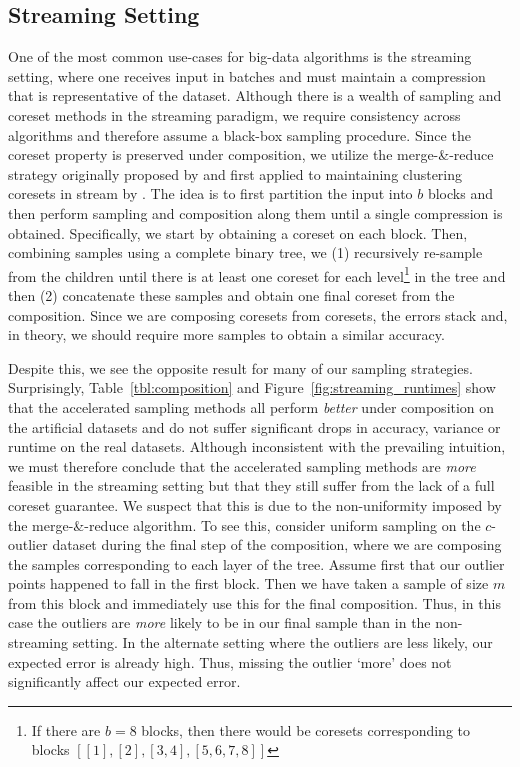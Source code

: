\subsection{Streaming Setting}
\label{ssec:streaming}



One of the most common use-cases for big-data algorithms is the streaming setting, where one receives input in batches and must maintain a compression that is
representative of the dataset. Although there is a wealth of sampling and coreset methods in the streaming paradigm, we require consistency across algorithms
and therefore assume a black-box sampling procedure. Since the coreset property is preserved under composition, we utilize the merge-\&-reduce strategy
originally proposed by \cite{BS80} and first applied to maintaining clustering coresets in stream by \cite{HaM04}. The idea is to first partition the input into
$b$ blocks and then perform sampling and composition along them until a single compression is obtained. Specifically, we start by obtaining a coreset on each
block. Then, combining samples using a complete binary tree, we (1) recursively re-sample from the children until there is at least one coreset for each
level\footnote{If there are $b=8$ blocks, then there would be coresets corresponding to blocks $[[1], [2], [3, 4], [5, 6, 7, 8]]$} in the tree and then (2)
concatenate these samples and obtain one final coreset from the composition. Since we are composing coresets from coresets, the errors stack and, in theory, we
should require more samples to obtain a similar accuracy.

Despite this, we see the opposite result for many of our sampling strategies. Surprisingly, Table~\ref{tbl:composition} and Figure~\ref{fig:streaming_runtimes}
show that the accelerated sampling methods all perform \emph{better} under composition on the artificial datasets and do not suffer significant drops in
accuracy, variance or runtime on the real datasets. Although inconsistent with the prevailing intuition, we must therefore conclude that the accelerated
sampling methods are \emph{more} feasible in the streaming setting but that they still suffer from the lack of a full coreset guarantee.  We suspect that this
is due to the non-uniformity imposed by the merge-\&-reduce algorithm. To see this, consider uniform sampling on the $c$-outlier dataset during the final step
of the composition, where we are composing the samples corresponding to each layer of the tree. Assume first that our outlier points happened to fall in the
first block. Then we have taken a sample of size $m$ from this block and immediately use this for the final composition. Thus, in this case the outliers are
\emph{more} likely to be in our final sample than in the non-streaming setting. In the alternate setting where the outliers are less likely, our
expected error is already high. Thus, missing the outlier `more' does not significantly affect our expected error. 


